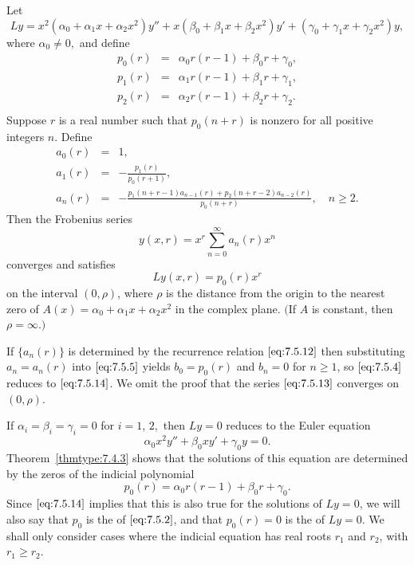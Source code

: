 \documentclass{ximera}
\begin{document}
\begin{theorem}\label{thmtype:7.5.2}
Let
$$
Ly=
x^2(\alpha_0+\alpha_1x+\alpha_2x^2)y''+x(\beta_0+\beta_1x+\beta_2x^2)y'
+(\gamma_0+\gamma_1x+\gamma_2x^2)y,
$$
where $\alpha_0\neq 0,$ and define
\begin{eqnarray*}
p_0(r)&=&\alpha_0r(r-1)+\beta_0r+\gamma_0,\\
p_1(r)&=&\alpha_1r(r-1)+\beta_1r+\gamma_1,\\
p_2(r)&=&\alpha_2r(r-1)+\beta_2r+\gamma_2.\\
\end{eqnarray*}
 Suppose $r$ is a real number such that $p_0(n+r)$ is nonzero
for all positive integers $n.$ Define
\begin{equation} \label{eq:7.5.12}
\begin{array}{ccl}
a_0(r)&=&1,\\
a_1(r)&=&-\frac{p_1(r)}{p_0(r+1)},\\
a_n(r)&=&-\frac{p_1(n+r-1)a_{n-1}(r)+p_2(n+r-2)a_{n-2}(r)}{p_0(n+r)},\quad n\geq2.
\end{array}
\end{equation}
Then the Frobenius series
\begin{equation} \label{eq:7.5.13}
y(x,r)=x^r\sum_{n=0}^\infty a_n(r)x^n
\end{equation}
converges and satisfies
\begin{equation} \label{eq:7.5.14}
Ly(x,r)=p_0(r)x^r
\end{equation}
on the interval $(0,\rho)$, where
 $\rho$ is the distance from the origin to the
nearest zero of $A(x)=\alpha_0+\alpha_1 x+\alpha_2 x^2$ in the complex
plane.
$($If
$A$ is constant, then $\rho=\infty$.$)$
\end{theorem}

If $\{a_n(r)\}$ is determined by the recurrence relation
$\eqref{eq:7.5.12}$ then substituting $a_n=a_n(r)$ into $\eqref{eq:7.5.5}$
yields
$b_0=p_0(r)$ and $b_n=0$ for $n\geq1$, so $\eqref{eq:7.5.4}$ reduces to
$\eqref{eq:7.5.14}$. We omit the proof that the series $\eqref{eq:7.5.13}$
converges on  $(0,\rho)$.

If $\alpha_i=\beta_i=\gamma_i=0$ for $i=1$, $2,$ then $Ly=0$ reduces to
the Euler equation
$$
\alpha_0x^2y''+\beta_0xy'+\gamma_0y=0.
$$
Theorem~\ref{thmtype:7.4.3} shows that the solutions of this equation are
determined by the zeros of the indicial polynomial
$$
p_0(r)=\alpha_0r(r-1)+\beta_0r+\gamma_0.
$$
Since $\eqref{eq:7.5.14}$ implies that this is also true for the solutions
of $Ly=0$, we will also say that $p_0$ is the  of $\eqref{eq:7.5.2}$, and that $p_0(r)=0$ is the  of $Ly=0$. We shall only consider cases where the
indicial equation has real roots $r_1$ and $r_2$, with $r_1\geq r_2$.
\end{document}
